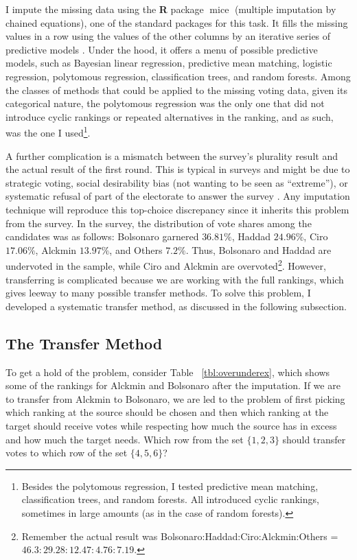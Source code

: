 \documentclass[hidelinks,11pt]{article} \usepackage[utf8]{inputenc}
\begin{document}
I impute the missing data using the \textbf{\textsf{R}} package \(\operatorname{mice}\) (multiple imputation by chained equations), one of the standard packages for this task. It fills the missing values in a row using the values of the other columns by an iterative series of predictive models \parencite{vanbuuren2018imputation}. Under the hood, it offers a menu of possible predictive models, such as Bayesian linear regression, predictive mean matching, logistic regression, polytomous regression, classification trees, and random forests. Among the classes of methods that could be applied to the missing voting data, given its categorical nature, the polytomous regression was the only one that did not introduce cyclic rankings or repeated alternatives in the ranking, and as such, was the one I used\footnote{Besides the polytomous
regression, I tested predictive mean matching, classification trees, and random
forests. All introduced cyclic rankings, sometimes in large amounts (as in the
case of random forests).}.


A further complication is a mismatch between the survey's plurality result and the actual result of the first round. This is typical in surveys and might be due to strategic voting, social desirability bias (not wanting to be seen as ``extreme''), or systematic refusal of part of the electorate to answer the survey \parencite{nishimura2016alternative}. Any imputation technique will reproduce this top-choice discrepancy since it inherits this problem from the survey. In the survey, the distribution of vote shares among the candidates was as follows: Bolsonaro garnered \(36.81\%\), Haddad \(24.96\%\), Ciro \(17.06\%\), Alckmin \(13.97\%\), and Others \(7.2\%\). Thus, Bolsonaro and Haddad are undervoted in the sample, while Ciro and Alckmin are overvoted\footnote{Remember the actual result was Bolsonaro:Haddad:Ciro:Alckmin:Others = \(46.3 : 29.28 : 12.47 : 4.76 : 7.19 \).}. However, transferring is complicated because we are working with the full rankings, which gives leeway to many possible transfer methods. To solve this problem, I developed a systematic transfer method, as discussed in the following subsection.

\subsection{The Transfer Method}
To get a hold of the problem,  consider Table ~\ref{tbl:overunderex}, which shows some of the rankings for Alckmin and Bolsonaro after the imputation. If we are to transfer from Alckmin to Bolsonaro, we are led to the problem of first picking which ranking at the source should be chosen and then which ranking at the target should receive votes while respecting how much the source has in excess and how much the target needs. Which row from the set \(\{1,2,3\}\) should transfer votes to which row of the set \(\{4,5,6\}\)?
\end{document}
